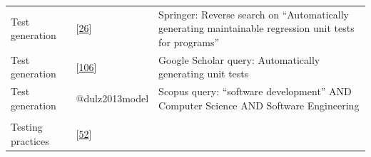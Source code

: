 \documentclass[]{book}
\begin{document}
\begin{longtable}[]{@{}lll@{}}
\begin{minipage}[t]{0.19\columnwidth}
Test generation\strut
\end{minipage} & \begin{minipage}[t]{0.41\columnwidth}\raggedright\strut
{[}\protect\hyperlink{ref-bowring2014obsidian}{26}{]}\strut
\end{minipage} & \begin{minipage}[t]{0.32\columnwidth}\raggedright\strut
Springer: Reverse search on ``Automatically generating maintainable
regression unit tests for programs''\strut
\end{minipage}\tabularnewline
\begin{minipage}[t]{0.19\columnwidth}\raggedright\strut
Test generation\strut
\end{minipage} & \begin{minipage}[t]{0.41\columnwidth}\raggedright\strut
{[}\protect\hyperlink{ref-shamshiri2018automatically}{106}{]}\strut
\end{minipage} & \begin{minipage}[t]{0.32\columnwidth}\raggedright\strut
Google Scholar query: Automatically generating unit tests\strut
\end{minipage}\tabularnewline
\begin{minipage}[t]{0.19\columnwidth}\raggedright\strut
Test generation\strut
\end{minipage} & \begin{minipage}[t]{0.41\columnwidth}\raggedright\strut
@dulz2013model\strut
\end{minipage} & \begin{minipage}[t]{0.32\columnwidth}\raggedright\strut
Scopus query: ``software development'' AND Computer Science AND Software
Engineering\strut
\end{minipage}\tabularnewline
\begin{minipage}[t]{0.19\columnwidth}\raggedright\strut
\strut
\end{minipage} & \begin{minipage}[t]{0.41\columnwidth}\raggedright\strut
\strut
\end{minipage} & \begin{minipage}[t]{0.32\columnwidth}\raggedright\strut
\strut
\end{minipage}\tabularnewline
\begin{minipage}[t]{0.19\columnwidth}\raggedright\strut
Testing practices\strut
\end{minipage} & \begin{minipage}[t]{0.41\columnwidth}\raggedright\strut
{[}\protect\hyperlink{ref-GAROUSI20131354}{52}{]}\strut

\end{minipage}
\end{longtable}
\end{document}
